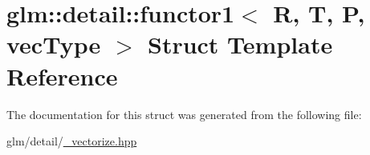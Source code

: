 \hypertarget{structglm_1_1detail_1_1functor1}{\section{glm\-:\-:detail\-:\-:functor1$<$ R, T, P, vec\-Type $>$ Struct Template Reference}
\label{structglm_1_1detail_1_1functor1}
}


The documentation for this struct was generated from the following file\-:\begin{DoxyCompactItemize}
\item 
glm/detail/\hyperlink{__vectorize_8hpp}{\-\_\-vectorize.\-hpp}\end{DoxyCompactItemize}
